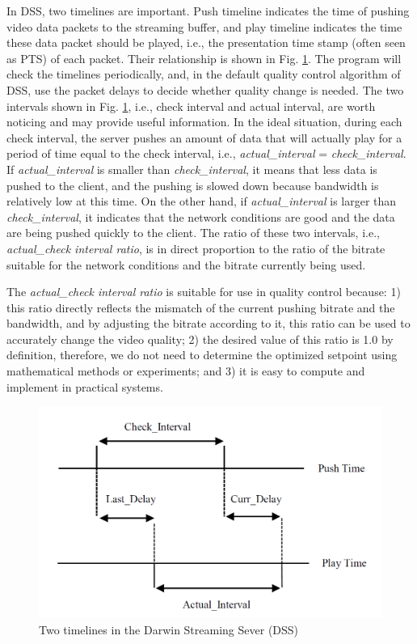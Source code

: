 \documentclass[journal,draftclsnofoot,onecolumn]{IEEEtran}
\begin{document}
In DSS, two timelines are important. Push timeline indicates the time of pushing video data packets to the streaming buffer, and play timeline indicates the time these data packet should be played, i.e., the presentation time stamp (often seen as PTS) of each packet. Their relationship is shown in Fig. \ref{fig:intervals}. The program will check the timelines periodically, and, in the default quality control algorithm of DSS, use the packet delays to decide whether quality change is needed. The two intervals shown in Fig. \ref{fig:intervals}, i.e., check interval and actual interval, are worth noticing and may provide useful information. In the ideal situation, during each check interval, the server pushes an amount of data that will actually play for a period of time equal to the check interval, i.e., \textit{actual\_interval} = \textit{check\_interval}. If \textit{actual\_interval} is smaller than \textit{check\_interval}, it means that less data is pushed to the client, and the pushing is slowed down because bandwidth is relatively low at this time. On the other hand, if \textit{actual\_interval} is larger than \textit{check\_interval}, it indicates that the network conditions are good and the data are being pushed quickly to the client. The ratio of these two intervals, i.e., \textit{actual\_check interval ratio}, is in direct proportion to the ratio of the bitrate suitable for the network conditions and the bitrate currently being used.

The \textit{actual\_check interval ratio} is suitable for use in quality control because: 1) this ratio directly reflects the mismatch of the current pushing bitrate and the bandwidth, and by adjusting the bitrate according to it, this ratio can be used to accurately change the video quality; 2) the desired value of this ratio is 1.0 by definition, therefore, we do not need to determine the optimized setpoint using mathematical methods or experiments; and 3) it is easy to compute and implement in practical systems.

\begin{figure}[t]
\centering
\includegraphics[width = 0.9\linewidth]{Intervals.png}
\caption{Two timelines in the Darwin Streaming Sever (DSS) \label{fig:intervals}}
\end{figure}
\end{document}
